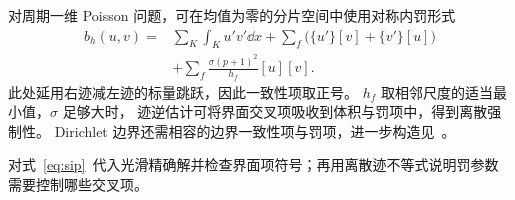 对周期一维 Poisson 问题，可在均值为零的分片空间中使用对称内罚形式
\begin{equation}\label{eq:sip}
\begin{aligned}
b_h(u,v)={}&\sum_K\int_Ku'v'\dd x
+\sum_f\bigl(\{u'\}[v]+\{v'\}[u]\bigr)\\
&+\sum_f\frac{\sigma(p+1)^2}{h_f}[u][v].
\end{aligned}
\end{equation}
此处延用右迹减左迹的标量跳跃，因此一致性项取正号。
$h_f$ 取相邻尺度的适当最小值，$\sigma$ 足够大时，
迹逆估计可将界面交叉项吸收到体积与罚项中，得到离散强制性。
Dirichlet 边界还需相容的边界一致性项与罚项，进一步构造见~\cite{arnold2002}。

{对式~\eqref{eq:sip}~代入光滑精确解并检查界面项符号；再用离散迹不等式说明罚参数需要控制哪些交叉项。}
